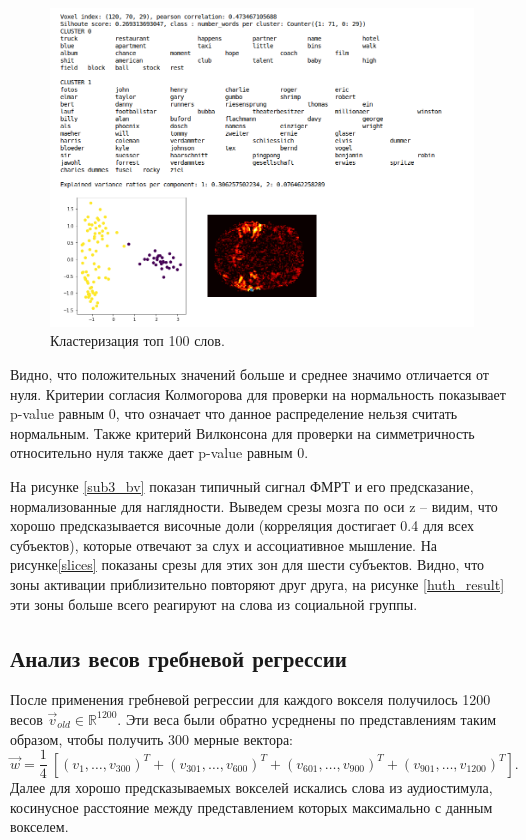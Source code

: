 \documentclass[pdftex,ptm,12pt,a4paper]{report}
\theoremstyle{definition}
\begin{document}
\begin{figure}[h]
\includegraphics[scale=0.55]{images/sub15_names.png}
\caption{Кластеризация топ 100 слов.}
\label{sub15_names}
\end{figure}
 
Видно, что положительных значений больше и среднее значимо отличается от нуля. 
Критерии согласия Колмогорова для проверки на нормальность показывает p-value равным 0, что означает что данное распределение нельзя считать нормальным. 
Также критерий Вилконсона для проверки на симметричность относительно нуля также дает p-value равным 0.

На рисунке \ref{sub3_bv} показан типичный сигнал ФМРТ и его предсказание, нормализованные для наглядности. Выведем срезы мозга  по оси z -- видим, что хорошо предсказывается височные доли (корреляция достигает 0.4 для всех субъектов), которые отвечают за слух и ассоциативное мышление. 
На рисунке\ref{slices} показаны срезы для этих зон для шести субъектов. Видно, что зоны активации приблизительно повторяют друг друга, на рисунке \ref{huth_result} эти зоны больше всего реагируют на слова из социальной группы. 


\subsection{Анализ весов гребневой регрессии}
После применения гребневой регрессии для каждого вокселя получилось 1200 весов $\vec{v}_{old} \in \mathbb{R}^{1200}$. Эти веса были обратно усреднены по представлениям таким образом, чтобы получить 300 мерные вектора:
$$\vec{w} = \frac{1}{4}\ [(v_1, \ldots, v_{300})^{T} + (v_{301}, \ldots, v_{600})^{T} + (v_{601}, \ldots, v_{900})^{T} + (v_{901}, \ldots, v_{1200})^{T}].$$
Далее для хорошо предсказываемых вокселей искались слова из аудиостимула, косинусное расстояние между представлением которых максимально с данным вокселем.
\end{document}
